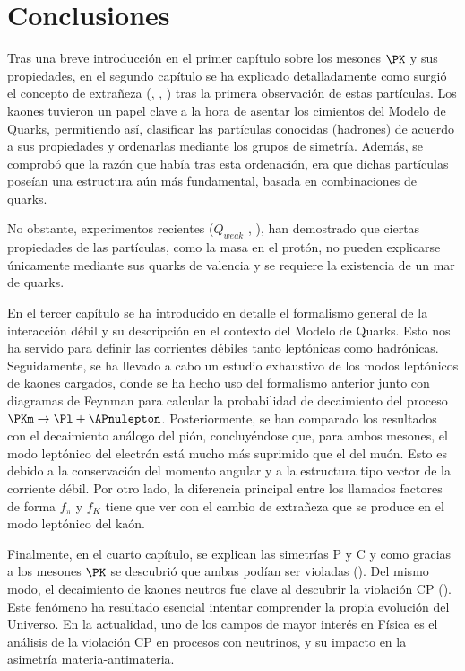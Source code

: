 \chapter{Conclusiones}\label{cap:conclusions}

Tras una breve introducción en el primer capítulo sobre los mesones $\PK$ y sus propiedades, en el segundo capítulo se ha explicado detalladamente como surgió el concepto de extrañeza (\cite{Nature1}, \cite{Nishijima1955}, \cite{Pais}) tras la primera observación de estas partículas. Los kaones tuvieron un papel clave a la hora de asentar los cimientos del Modelo de Quarks, permitiendo así, clasificar las partículas conocidas (hadrones) de acuerdo a sus propiedades y ordenarlas mediante los grupos de simetría. Además, se comprobó que la razón que había tras esta ordenación, era que dichas partículas poseían una estructura aún más fundamental, basada en combinaciones de quarks.

No obstante, experimentos recientes ($Q_{weak}$ \cite{nuruzzaman}, \cite{carlini}), han demostrado que ciertas propiedades de las partículas, como la masa en el protón, no pueden explicarse únicamente mediante sus quarks de valencia y se requiere la existencia de un mar de quarks.

En el tercer capítulo se ha introducido en detalle el formalismo general de la interacción débil y su descripción en el contexto del Modelo de Quarks. Esto nos ha servido para definir las corrientes débiles tanto leptónicas como hadrónicas. Seguidamente, se ha llevado a cabo un estudio exhaustivo de los modos leptónicos de kaones cargados, donde se ha hecho uso del formalismo anterior junto con diagramas de Feynman para calcular la probabilidad de decaimiento del proceso $\PKm \rightarrow \Pl + \APnulepton$. Posteriormente, se han comparado los resultados con el decaimiento análogo del pión, concluyéndose que, para ambos mesones, el modo leptónico del electrón está mucho más suprimido que el del muón. Esto es debido a la conservación del momento angular y a la estructura tipo vector de la corriente débil. Por otro lado, la diferencia principal entre los llamados factores de forma $f_{\pi}$ y $f_{K}$ tiene que ver con el cambio de extrañeza que se produce en el modo leptónico del kaón.

Finalmente, en el cuarto capítulo, se explican las simetrías P y C y como gracias a los mesones $\PK$ se descubrió que ambas podían ser violadas (\cite{Wu1957}). Del mismo modo, el decaimiento de kaones neutros fue clave al descubrir la violación CP (\cite{Cronin}). Este fenómeno ha resultado esencial intentar comprender la propia evolución del Universo. En la actualidad, uno de los campos de mayor interés en Física es el análisis de la violación CP en procesos con neutrinos, y su impacto en la asimetría materia-antimateria.
